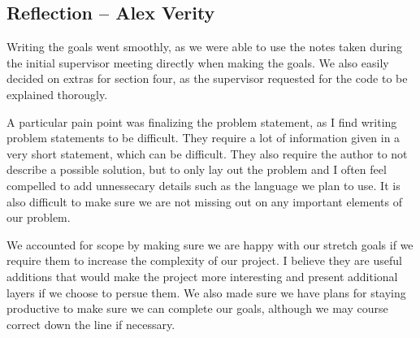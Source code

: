 \documentclass{article}
\begin{document}
\subsection{Reflection -- Alex Verity}

Writing the goals went smoothly, as we were able to use the notes taken during
the initial supervisor meeting directly when making the goals. We also easily
decided on extras for section four, as the supervisor requested for the code
to be explained thorougly.\newline

A particular pain point was finalizing the problem statement, as I find
writing problem statements to be difficult. They require a lot of information
given in a very short statement, which can be difficult. They also require
the author to not describe a possible solution, but to only lay out the
problem and I often feel compelled to add unnessecary details such as the
language we plan to use. It is also difficult to make sure we are not missing
out on any important elements of our problem.\newline

We accounted for scope by making sure we are happy with our stretch goals if
we require them to increase the complexity of our project. I believe they are
useful additions that would make the project more interesting and present
additional layers if we choose to persue them. We also made sure we have plans
for staying productive to make sure we can complete our goals, although we may
course correct down the line if necessary.
\end{document}
